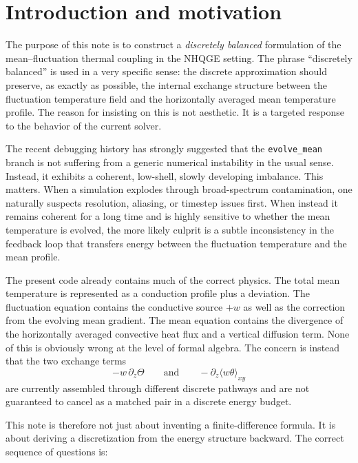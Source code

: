 \documentclass[11pt]{article}
\begin{document}
\tableofcontents

\section{Introduction and motivation}

The purpose of this note is to construct a \emph{discretely balanced} formulation of the mean--fluctuation thermal coupling in the NHQGE setting. The phrase ``discretely balanced'' is used in a very specific sense: the discrete approximation should preserve, as exactly as possible, the internal exchange structure between the fluctuation temperature field and the horizontally averaged mean temperature profile. The reason for insisting on this is not aesthetic. It is a targeted response to the behavior of the current solver.

The recent debugging history has strongly suggested that the \texttt{evolve\_mean} branch is not suffering from a generic numerical instability in the usual sense. Instead, it exhibits a coherent, low-shell, slowly developing imbalance. This matters. When a simulation explodes through broad-spectrum contamination, one naturally suspects resolution, aliasing, or timestep issues first. When instead it remains coherent for a long time and is highly sensitive to whether the mean temperature is evolved, the more likely culprit is a subtle inconsistency in the feedback loop that transfers energy between the fluctuation temperature and the mean profile.

The present code already contains much of the correct physics. The total mean temperature is represented as a conduction profile plus a deviation. The fluctuation equation contains the conductive source $+w$ as well as the correction from the evolving mean gradient. The mean equation contains the divergence of the horizontally averaged convective heat flux and a vertical diffusion term. None of this is obviously wrong at the level of formal algebra. The concern is instead that the two exchange terms
\[
-w\,\partial_z\Theta
\qquad\text{and}\qquad
-\partial_z\langle w\theta\rangle_{xy}
\]
are currently assembled through different discrete pathways and are not guaranteed to cancel as a matched pair in a discrete energy budget.

This note is therefore not just about inventing a finite-difference formula. It is about deriving a discretization from the energy structure backward. The correct sequence of questions is:
\end{document}
